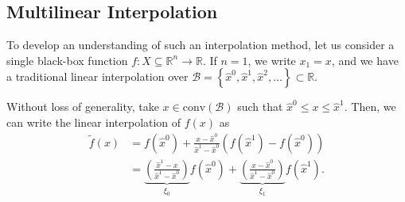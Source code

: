 \documentclass[pdflatex,sn-mathphys-num]{sn-jnl}%
\newcommand{\new}[1]{#1}
\newcommand{\R}{\mathbb{R}}
\begin{document}
\subsection{Multilinear Interpolation}

To develop an understanding of such an interpolation method, let us consider a single black-box function $f: X \subseteq \R^{n} \rightarrow \R$.
\new{%
If $n=1$, we write $x_1=x$, and we have a traditional linear interpolation over $\mathcal{B}=\left\{ \hat{x}^{0},\hat{x}^{1},\hat{x}^{2},\ldots \right\} \subset \R$.
}
Without loss of generality, take $x\in \text{conv}( \mathcal{B} ) $ such that $\hat{x}^0\le x\le \hat{x}^1$.
Then, we can write the linear interpolation of $f(x)$ as
\begin{equation}
\begin{aligned}
\widetilde{f}(x) &= f(\hat{x}^0) + \frac{x - \hat{x}^0}{\hat{x}^1 - \hat{x}^0}(f(\hat{x}^1) - f(\hat{x}^0))  \\
	      &= \underbrace{\left(\frac{\hat{x}^1-x}{\hat{x}^1 - \hat{x}^0}\right)}_{\xi_{0}} f(\hat{x}^0) + \underbrace{\left(\frac{x - \hat{x}^0}{\hat{x}^1 - \hat{x}^0}\right)}_{\xi_{1}}f(\hat{x}^1)
.\end{aligned}
\end{equation}
\end{document}
